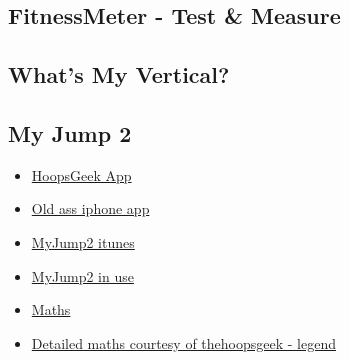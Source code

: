 \subsection{FitnessMeter - Test \& Measure}
\label{research:fitness-meter}
\subsection{What's My Vertical?}
\label{research:whats-my-vert}
\subsection{My Jump 2}
\label{research:my-jump}


\begin{itemize}
	\item \href{https://www.thehoopsgeek.com/measurement-app/#manual}{HoopsGeek App}
	\item \href{https://apps.apple.com/us/app/fitnessmeter-test-measure/id477488986}{Old ass iphone app}
	\item \href{https://apps.apple.com/gb/app/my-jump-2/id1148617550#?platform=iphone}{MyJump2 itunes}
	\item \href{https://www.youtube.com/watch?v=tIBiHDyev6w}{MyJump2 in use}
	\item \href{https://www.topendsports.com/testing/products/vertical-jump/video.htm}{Maths}
	\item \href{https://www.thehoopsgeek.com/the-physics-of-the-vertical-jump/}{Detailed maths courtesy of thehoopsgeek - legend}
\end{itemize}